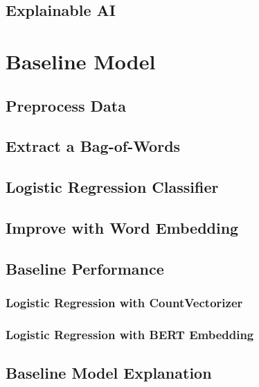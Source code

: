 \documentclass[ %
                    author={Louis Wang},
                supervisor={Dr. Qiang Liu},
                    degree={MSc},
                     title={Identification of Suicide Ideation in Texts},
                      type={},
                      year={2024}]{dissertation}
\begin{document}
\section{Explainable AI}


\chapter{Baseline Model}
\label{chap:execution1}

\section{Preprocess Data}

\section{Extract a Bag-of-Words}

\section{Logistic Regression Classifier}

\section{Improve with Word Embedding}

\section{Baseline Performance}

\subsection{Logistic Regression with CountVectorizer}

\subsection{Logistic Regression with BERT Embedding}

\section{Baseline Model Explanation}

\end{document}
